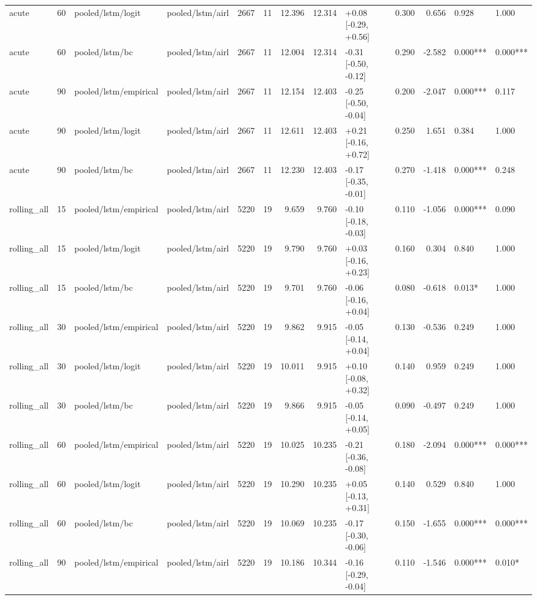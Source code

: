 \begin{tabular}{lrllrrrrlrrll}
acute & 60 & pooled/lstm/logit & pooled/lstm/airl & 2667 & 11 & 12.396 & 12.314 & +0.08 [-0.29, +0.56] & 0.300 & 0.656 & 0.928 & 1.000 \\
acute & 60 & pooled/lstm/bc & pooled/lstm/airl & 2667 & 11 & 12.004 & 12.314 & -0.31 [-0.50, -0.12] & 0.290 & -2.582 & 0.000*** & 0.000*** \\
acute & 90 & pooled/lstm/empirical & pooled/lstm/airl & 2667 & 11 & 12.154 & 12.403 & -0.25 [-0.50, -0.04] & 0.200 & -2.047 & 0.000*** & 0.117 \\
acute & 90 & pooled/lstm/logit & pooled/lstm/airl & 2667 & 11 & 12.611 & 12.403 & +0.21 [-0.16, +0.72] & 0.250 & 1.651 & 0.384 & 1.000 \\
acute & 90 & pooled/lstm/bc & pooled/lstm/airl & 2667 & 11 & 12.230 & 12.403 & -0.17 [-0.35, -0.01] & 0.270 & -1.418 & 0.000*** & 0.248 \\
rolling_all & 15 & pooled/lstm/empirical & pooled/lstm/airl & 5220 & 19 & 9.659 & 9.760 & -0.10 [-0.18, -0.03] & 0.110 & -1.056 & 0.000*** & 0.090 \\
rolling_all & 15 & pooled/lstm/logit & pooled/lstm/airl & 5220 & 19 & 9.790 & 9.760 & +0.03 [-0.16, +0.23] & 0.160 & 0.304 & 0.840 & 1.000 \\
rolling_all & 15 & pooled/lstm/bc & pooled/lstm/airl & 5220 & 19 & 9.701 & 9.760 & -0.06 [-0.16, +0.04] & 0.080 & -0.618 & 0.013* & 1.000 \\
rolling_all & 30 & pooled/lstm/empirical & pooled/lstm/airl & 5220 & 19 & 9.862 & 9.915 & -0.05 [-0.14, +0.04] & 0.130 & -0.536 & 0.249 & 1.000 \\
rolling_all & 30 & pooled/lstm/logit & pooled/lstm/airl & 5220 & 19 & 10.011 & 9.915 & +0.10 [-0.08, +0.32] & 0.140 & 0.959 & 0.249 & 1.000 \\
rolling_all & 30 & pooled/lstm/bc & pooled/lstm/airl & 5220 & 19 & 9.866 & 9.915 & -0.05 [-0.14, +0.05] & 0.090 & -0.497 & 0.249 & 1.000 \\
rolling_all & 60 & pooled/lstm/empirical & pooled/lstm/airl & 5220 & 19 & 10.025 & 10.235 & -0.21 [-0.36, -0.08] & 0.180 & -2.094 & 0.000*** & 0.000*** \\
rolling_all & 60 & pooled/lstm/logit & pooled/lstm/airl & 5220 & 19 & 10.290 & 10.235 & +0.05 [-0.13, +0.31] & 0.140 & 0.529 & 0.840 & 1.000 \\
rolling_all & 60 & pooled/lstm/bc & pooled/lstm/airl & 5220 & 19 & 10.069 & 10.235 & -0.17 [-0.30, -0.06] & 0.150 & -1.655 & 0.000*** & 0.000*** \\
rolling_all & 90 & pooled/lstm/empirical & pooled/lstm/airl & 5220 & 19 & 10.186 & 10.344 & -0.16 [-0.29, -0.04] & 0.110 & -1.546 & 0.000*** & 0.010* \\

\end{tabular}
